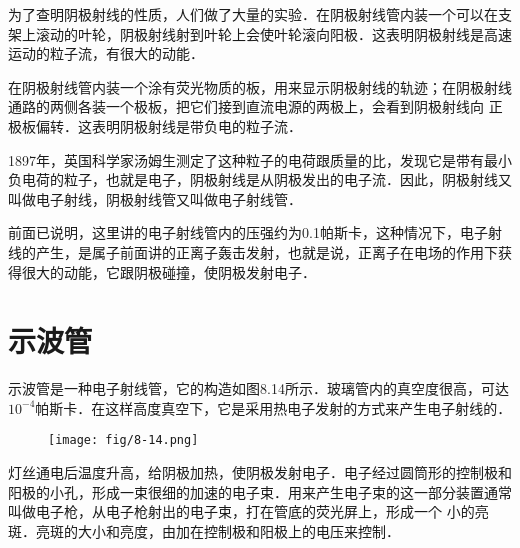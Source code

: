 为了查明阴极射线的性质，人们做了大量的实验．在阴极射线管内装一个可以在支架上滚动的叶轮，阴极射线射到叶轮上会使叶轮滚向阳极．这表明阴极射线是高速运动的粒子流，有很大的动能．

在阴极射线管内装一个涂有荧光物质的板，用来显示阴极射线的轨迹；在阴极射线通路的两侧各装一个极板，把它们接到直流电源的两极上，会看到阴极射线向
正极板偏转．这表明阴极射线是带负电的粒子流．

1897年，英国科学家汤姆生测定了这种粒子的电荷跟质量的比，发现它是带有最小负电荷的粒子，也就是电子，阴极射线是从阴极发出的电子流．因此，阴极射线又叫做电子射线，阴极射线管又叫做电子射线管．

前面已说明，这里讲的电子射线管内的压强约为0.1帕斯卡，这种情况下，电子射线的产生，是属子前面讲的正离子轰击发射，也就是说，正离子在电场的作用下获得很大的动能，它跟阴极碰撞，使阴极发射电子．

\section{示波管}
示波管是一种电子射线管，它的构造如图8.14所示．玻璃管内的真空度很高，可达$10^{-4}$帕斯卡．在这样高度真空下，它是采用热电子发射的方式来产生电子射线的．
\begin{figure}[htp]\centering
    \texttt{[image: fig/8-14.png]}
    \caption{}
    \end{figure}

灯丝通电后温度升高，给阴极加热，使阴极发射电子．电子经过圆筒形的控制极和阳极的小孔，形成一束很细的加速的电子束．用来产生电子束的这一部分装置通常叫做电子枪，从电子枪射出的电子束，打在管底的荧光屏上，形成一个
小的亮斑．亮斑的大小和亮度，由加在控制极和阳极上的电压来控制．


